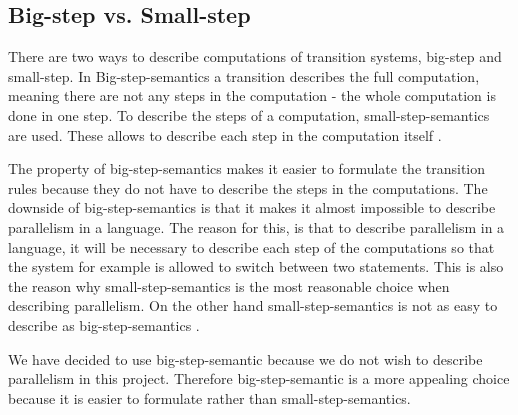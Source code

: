 \subsection{Big-step vs. Small-step}
\label{sec:BvsS}
There are two ways to describe computations of transition systems, big-step and small-step. In Big-step-semantics a transition describes the full computation, meaning there are not any steps in the computation - the whole computation is done in one step. To describe the steps of a computation, small-step-semantics are used. These allows to describe each step in the computation itself \citep{HHTree}.

The property of big-step-semantics makes it easier to formulate the transition rules because they do not have to describe the steps in the computations. The downside of big-step-semantics is that it makes it almost impossible to describe parallelism in a language. The reason for this, is that to describe parallelism in a language, it will be necessary to describe each step of the computations so that the system for example is allowed to switch between two statements. This is also the reason why small-step-semantics is the most reasonable choice when describing parallelism. On the other hand small-step-semantics is not as easy to describe as big-step-semantics \citep{HHTree}.

We have decided to use big-step-semantic because we do not wish to describe parallelism in this project. Therefore big-step-semantic is a more appealing choice because it is easier to formulate rather than small-step-semantics.
